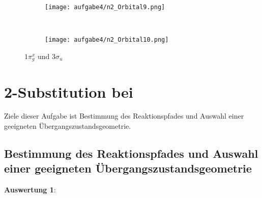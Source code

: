 \documentclass[12pt]{article}
\begin{document}
\begin{onehalfspace}
\begin{figure}[!hptb]
    \centering
    \begin{subfigure}[b]{0.4\textwidth}
        \texttt{[image: aufgabe4/n2\_Orbital9.png]}
    \end{subfigure}
    ~ %
    \begin{subfigure}[b]{0.4\textwidth}
        \texttt{[image: aufgabe4/n2\_Orbital10.png]}
    \end{subfigure}
    \caption{$1 \pi _g^x$   und $3 \sigma _u$}
\end{figure}
\section{2-Substitution bei }
Ziele dieser Aufgabe ist Bestimmung des Reaktionspfades und Auswahl einer geeigneten Übergangszustandsgeometrie.
\newpage
\subsection{Bestimmung des Reaktionspfades und Auswahl einer geeigneten Übergangszustandsgeometrie}
\textbf{Auswertung 1}:


\end{onehalfspace}
\end{document}
